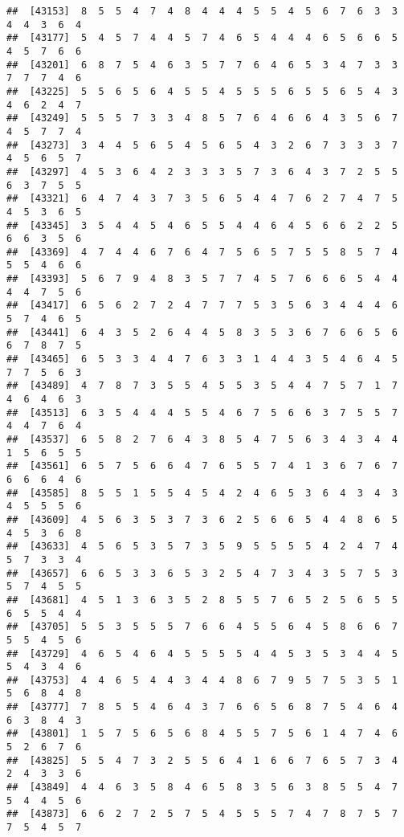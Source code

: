 \documentclass[
]{book}
\begin{document}
\begin{verbatim}
##  [43153]  8  5  5  4  7  4  8  4  4  4  5  5  4  5  6  7  6  3  3  4  4  3  6  4
##  [43177]  5  4  5  7  4  4  5  7  4  6  5  4  4  4  6  5  6  6  5  4  5  7  6  6
##  [43201]  6  8  7  5  4  6  3  5  7  7  6  4  6  5  3  4  7  3  3  7  7  7  4  6
##  [43225]  5  5  6  5  6  4  5  5  4  5  5  5  6  5  5  6  5  4  3  4  6  2  4  7
##  [43249]  5  5  5  7  3  3  4  8  5  7  6  4  6  6  4  3  5  6  7  4  5  7  7  4
##  [43273]  3  4  4  5  6  5  4  5  6  5  4  3  2  6  7  3  3  3  7  4  5  6  5  7
##  [43297]  4  5  3  6  4  2  3  3  3  5  7  3  6  4  3  7  2  5  5  6  3  7  5  5
##  [43321]  6  4  7  4  3  7  3  5  6  5  4  4  7  6  2  7  4  7  5  4  5  3  6  5
##  [43345]  3  5  4  4  5  4  6  5  5  4  4  6  4  5  6  6  2  2  5  6  6  3  5  6
##  [43369]  4  7  4  4  6  7  6  4  7  5  6  5  7  5  5  8  5  7  4  5  5  4  6  6
##  [43393]  5  6  7  9  4  8  3  5  7  7  4  5  7  6  6  6  5  4  4  4  4  7  5  6
##  [43417]  6  5  6  2  7  2  4  7  7  7  5  3  5  6  3  4  4  4  6  5  7  4  6  5
##  [43441]  6  4  3  5  2  6  4  4  5  8  3  5  3  6  7  6  6  5  6  6  7  8  7  5
##  [43465]  6  5  3  3  4  4  7  6  3  3  1  4  4  3  5  4  6  4  5  7  7  5  6  3
##  [43489]  4  7  8  7  3  5  5  4  5  5  3  5  4  4  7  5  7  1  7  4  6  4  6  3
##  [43513]  6  3  5  4  4  4  5  5  4  6  7  5  6  6  3  7  5  5  7  4  4  7  6  4
##  [43537]  6  5  8  2  7  6  4  3  8  5  4  7  5  6  3  4  3  4  4  1  5  6  5  5
##  [43561]  6  5  7  5  6  6  4  7  6  5  5  7  4  1  3  6  7  6  7  6  6  6  4  6
##  [43585]  8  5  5  1  5  5  4  5  4  2  4  6  5  3  6  4  3  4  3  4  5  5  5  6
##  [43609]  4  5  6  3  5  3  7  3  6  2  5  6  6  5  4  4  8  6  5  4  5  3  6  8
##  [43633]  4  5  6  5  3  5  7  3  5  9  5  5  5  5  4  2  4  7  4  5  7  3  3  4
##  [43657]  6  6  5  3  3  6  5  3  2  5  4  7  3  4  3  5  7  5  3  5  7  4  5  5
##  [43681]  4  5  1  3  6  3  5  2  8  5  5  7  6  5  2  5  6  5  5  6  5  5  4  4
##  [43705]  5  5  3  5  5  5  7  6  6  4  5  5  6  4  5  8  6  6  7  5  5  4  5  6
##  [43729]  4  6  5  4  6  4  5  5  5  5  4  4  5  3  5  3  4  4  5  5  4  3  4  6
##  [43753]  4  4  6  5  4  4  3  4  4  8  6  7  9  5  7  5  3  5  1  5  6  8  4  8
##  [43777]  7  8  5  5  4  6  4  3  7  6  6  5  6  8  7  5  4  6  4  6  3  8  4  3
##  [43801]  1  5  7  5  6  5  6  8  4  5  5  7  5  6  1  4  7  4  6  5  2  6  7  6
##  [43825]  5  5  4  7  3  2  5  5  6  4  1  6  6  7  6  5  7  3  4  2  4  3  3  6
##  [43849]  4  4  6  3  5  8  4  6  5  8  3  5  6  3  8  5  5  4  7  5  4  4  5  6
##  [43873]  6  6  2  7  2  5  7  5  4  5  5  5  7  4  7  8  7  5  7  7  5  4  5  7

\end{verbatim}
\end{document}
